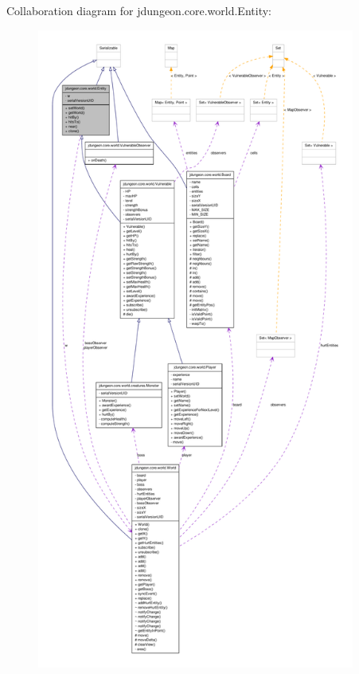 Collaboration diagram for jdungeon.core.world.Entity:
\nopagebreak
\begin{figure}[H]
\begin{center}
\leavevmode
\includegraphics[height=600pt]{classjdungeon_1_1core_1_1world_1_1_entity__coll__graph}
\end{center}
\end{figure}
